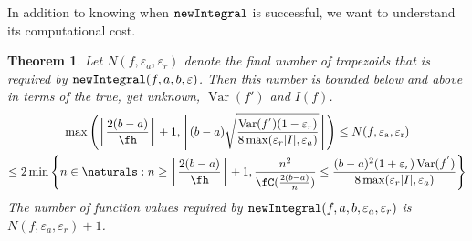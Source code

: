 \documentclass{iitthesis}
\newtheorem{theorem}{Theorem}
\DeclareMathOperator{\newinteg}{\texttt{\textup{newIntegral}}}
\DeclareMathOperator{\Var}{Var}
\newcommand{\hcut}{\fh}
\newcommand{\abstol}{\varepsilon_{\textrm{a}}}
\newcommand{\reltol}{\varepsilon_{\textrm{r}}}
\begin{document}

In addition to knowing when $\newinteg$ is successful, we want to understand its computational cost.

\begin{theorem} \label{costthm}
Let $N(f,\varepsilon_{a},\varepsilon_{r})$ denote the final number of trapezoids that is required by $\newinteg(f,a,b,\varepsilon)$.  Then this number is bounded below and above in terms of the true, yet unknown, $\Var(f')$ and $I(f)$.
\begin{multline} \label{integcostbd}
\max\left(\left\lfloor\frac{2(b-a)}{\hcut}\right\rfloor+1,\left\lceil(b-a)\sqrt{\frac{\Var(f^{'})(1-\varepsilon_{r})}{8\max(\varepsilon_{r}|I|,\varepsilon_{a})}}\right\rceil\right)\le N(f,\abstol,\reltol) \\
\leq 2\min\left\{n \in \naturals: n\ge \left\lfloor\frac{2(b-a)}{\hcut}\right\rfloor+1, \frac{n^{2}}{\fC(\frac{2(b-a)}{n})} \leq \frac{(b-a)^{2}(1+\varepsilon_{r})\Var(f^{'})}{8\max(\varepsilon_{r}|I|,\varepsilon_{a})}\right\}
\end{multline}
The number of function values required by $\newinteg(f,a,b,\varepsilon_{a},\varepsilon_{r})$ is $N(f,\varepsilon_{a},\varepsilon_{r})+1$.
\end{theorem}
\end{document}

